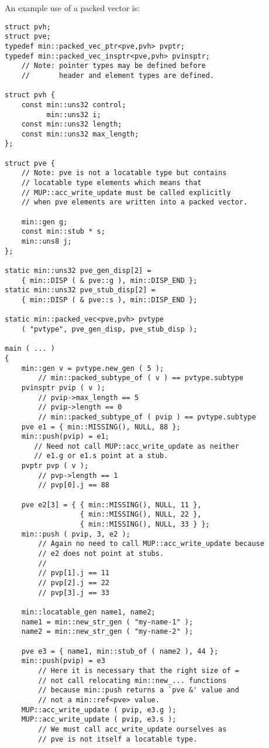 \documentclass[12pt]{article}
\newenvironment{indpar}[1][0.3in]%
	{\begin{list}{}%
		     {\setlength{\itemsep}{0in}%
		      \setlength{\topsep}{0in}%
		      \setlength{\parsep}{1ex}%
		      \setlength{\labelwidth}{#1}%
		      \setlength{\leftmargin}{#1}%
		      \addtolength{\leftmargin}{\labelsep}}%
	 \item}%
	{\end{list}}
\begin{document}
An example use of a packed vector is:
\begin{indpar}\begin{verbatim}
struct pvh;
struct pve;
typedef min::packed_vec_ptr<pve,pvh> pvptr;
typedef min::packed_vec_insptr<pve,pvh> pvinsptr;
    // Note: pointer types may be defined before
    //       header and element types are defined.

struct pvh {
    const min::uns32 control;
          min::uns32 i;
    const min::uns32 length;
    const min::uns32 max_length;
};

struct pve {
    // Note: pve is not a locatable type but contains
    // locatable type elements which means that
    // MUP::acc_write_update must be called explicitly
    // when pve elements are written into a packed vector.

    min::gen g;
    const min::stub * s;
    min::uns8 j;
};

static min::uns32 pve_gen_disp[2] =
    { min::DISP ( & pve::g ), min::DISP_END };
static min::uns32 pve_stub_disp[2] =
    { min::DISP ( & pve::s ), min::DISP_END };

static min::packed_vec<pve,pvh> pvtype
    ( "pvtype", pve_gen_disp, pve_stub_disp );

main ( ... )
{
    min::gen v = pvtype.new_gen ( 5 );
        // min::packed_subtype_of ( v ) == pvtype.subtype
    pvinsptr pvip ( v );
        // pvip->max_length == 5
        // pvip->length == 0
        // min::packed_subtype_of ( pvip ) == pvtype.subtype
    pve e1 = { min::MISSING(), NULL, 88 };
    min::push(pvip) = e1;
       // Need not call MUP::acc_write_update as neither
       // e1.g or e1.s point at a stub.
    pvptr pvp ( v );
        // pvp->length == 1
        // pvp[0].j == 88

    pve e2[3] = { { min::MISSING(), NULL, 11 },
                  { min::MISSING(), NULL, 22 },
                  { min::MISSING(), NULL, 33 } };
    min::push ( pvip, 3, e2 );
        // Again no need to call MUP::acc_write_update because
        // e2 does not point at stubs.
        //
        // pvp[1].j == 11
        // pvp[2].j == 22
        // pvp[3].j == 33

    min::locatable_gen name1, name2;
    name1 = min::new_str_gen ( "my-name-1" );
    name2 = min::new_str_gen ( "my-name-2" );

    pve e3 = { name1, min::stub_of ( name2 ), 44 };
    min::push(pvip) = e3
        // Here it is necessary that the right size of =
        // not call relocating min::new_... functions
        // because min::push returns a `pve &' value and
        // not a min::ref<pve> value.
    MUP::acc_write_update ( pvip, e3.g ); 
    MUP::acc_write_update ( pvip, e3.s ); 
        // We must call acc_write_update ourselves as
        // pve is not itself a locatable type.


\end{verbatim}
\end{indpar}
\end{document}
